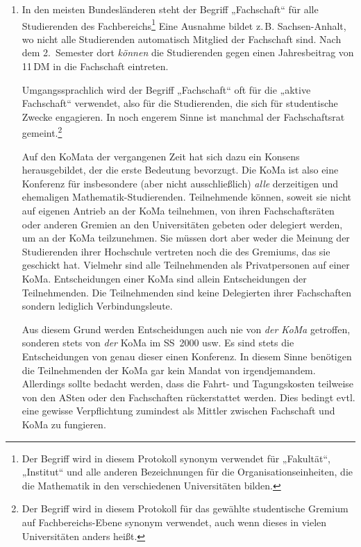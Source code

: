 \begin{enumerate}
\renewcommand\labelenumi{zu \theenumi:}
\item In den meisten Bundesländeren steht der Begriff „Fachschaft“ für alle
	Studierenden des Fachbereichs\footnote{Der Begriff wird in diesem
	Protokoll synonym verwendet für „Fakultät“, „Institut“ und alle anderen
	Bezeichnungen für die Organisationseinheiten, die die Mathematik in den
	verschiedenen Universitäten bilden.} Eine Ausnahme bildet z.\,B.
	Sachsen-Anhalt, wo nicht alle Studierenden automatisch Mitglied der
	Fachschaft sind. Nach dem 2.~Semester dort \emph{können} die
	Studierenden gegen einen Jahresbeitrag von 11\,DM in die Fachschaft
	eintreten.

	Umgangssprachlich wird der Begriff „Fachschaft“ oft für die „aktive
	Fachschaft“ verwendet, also für die Studierenden, die sich für
	studentische Zwecke engagieren. In noch engerem Sinne ist manchmal der
	Fachschaftsrat gemeint.\footnote{Der Begriff wird in diesem Protokoll
	für das gewählte studentische Gremium auf Fachbereichs-Ebene synonym
	verwendet, auch wenn dieses in vielen Universitäten anders heißt.}

	Auf den KoMata der vergangenen Zeit hat sich dazu ein Konsens
	herausgebildet, der die erste Bedeutung bevorzugt. Die KoMa ist also
	eine Konferenz für insbesondere (aber nicht ausschließlich) \emph{alle}
	derzeitigen und ehemaligen Mathematik-Studierenden. Teilnehmende
	können, soweit sie nicht auf eigenen Antrieb an der KoMa teilnehmen,
	von ihren Fachschaftsräten oder anderen Gremien an den Universitäten
	gebeten oder delegiert werden, um an der KoMa teilzunehmen. Sie müssen
	dort aber weder die Meinung der Studierenden ihrer Hochschule vertreten
	noch die des Gremiums, das sie geschickt hat. Vielmehr sind alle
	Teilnehmenden als Privatpersonen auf einer KoMa. Entscheidungen einer
	KoMa sind allein Entscheidungen der Teilnehmenden. Die Teilnehmenden
	sind keine Delegierten ihrer Fachschaften sondern lediglich
	Verbindungsleute.

	Aus diesem Grund werden Entscheidungen auch nie von \emph{der KoMa}
	getroffen, sonderen stets von \emph{der} KoMa im SS~2000 usw. Es sind stets
	die Entscheidungen von genau dieser einen Konferenz. In diesem Sinne
	benötigen die Teilnehmenden der KoMa gar kein Mandat von
	irgendjemandem. Allerdings sollte bedacht werden, dass die Fahrt- und
	Tagungskosten teilweise von den ASten oder den Fachschaften
	rückerstattet werden. Dies bedingt evtl.  eine gewisse Verpflichtung
	zumindest als Mittler zwischen Fachschaft und KoMa zu fungieren.


\end{enumerate}
